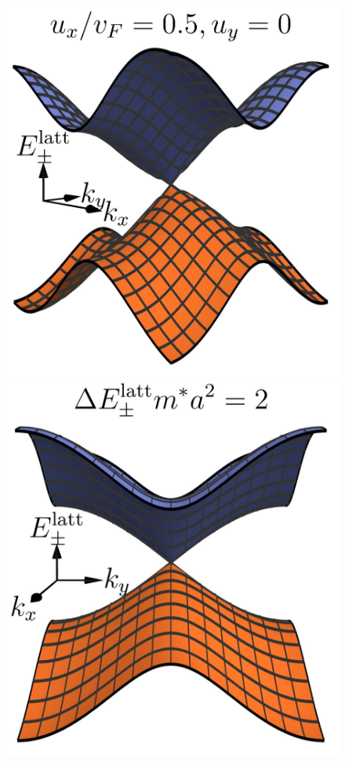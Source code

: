 \documentclass[submission, Phys]{SciPost}
\begin{document}
\begin{figure}[ht]
    \includegraphics{fig/lattice_dispersion_5.jpg}
    \includegraphics{fig/lattice_dispersion_6.jpg}

\end{figure}
\end{document}
